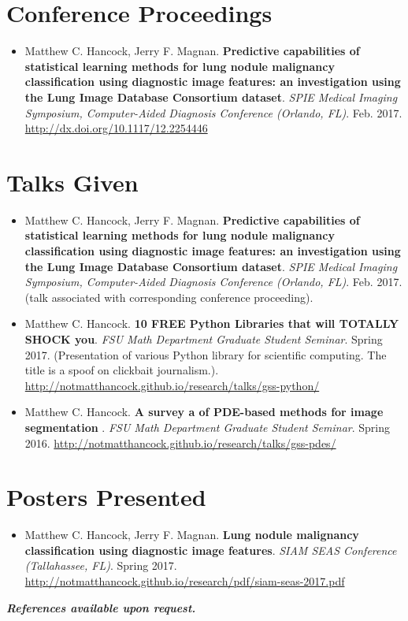 \documentclass[a4paper,10pt]{report}
\begin{document}
\section{Conference Proceedings}

\begin{itemize}
    \item Matthew C. Hancock, Jerry F. Magnan. \textbf{Predictive capabilities of statistical learning methods for lung nodule malignancy classification using diagnostic image features: an investigation using the Lung Image Database Consortium dataset}. \textit{SPIE Medical Imaging Symposium, Computer-Aided Diagnosis Conference (Orlando, FL)}. Feb. 2017. \url{http://dx.doi.org/10.1117/12.2254446}\end{itemize}


\section{Talks Given}

\begin{itemize}
    \item Matthew C. Hancock, Jerry F. Magnan. \textbf{Predictive capabilities of statistical learning methods for lung nodule malignancy classification using diagnostic image features: an investigation using the Lung Image Database Consortium dataset}. \textit{SPIE Medical Imaging Symposium, Computer-Aided Diagnosis Conference (Orlando, FL)}. Feb. 2017. (talk associated with corresponding conference proceeding).\end{itemize}
\begin{itemize}
    \item Matthew C. Hancock. \textbf{10 FREE Python Libraries that will TOTALLY SHOCK you}. \textit{FSU Math Department Graduate Student Seminar}. Spring 2017. (Presentation of various Python library for scientific computing. The title is a spoof on clickbait journalism.). \url{http://notmatthancock.github.io/research/talks/gss-python/}\end{itemize}
\begin{itemize}
    \item Matthew C. Hancock. \textbf{A survey a of PDE-based methods for image segmentation }. \textit{FSU Math Department Graduate Student Seminar}. Spring 2016. \url{http://notmatthancock.github.io/research/talks/gss-pdes/}\end{itemize}


\section{Posters Presented}

\begin{itemize}
    \item Matthew C. Hancock, Jerry F. Magnan. \textbf{Lung nodule malignancy classification using diagnostic image features}. \textit{SIAM SEAS Conference (Tallahassee, FL)}. Spring 2017. \url{http://notmatthancock.github.io/research/pdf/siam-seas-2017.pdf}\end{itemize}

\vspace{0.25in}
 
\noindent\textit{\bf References available upon request.}
\end{document}
